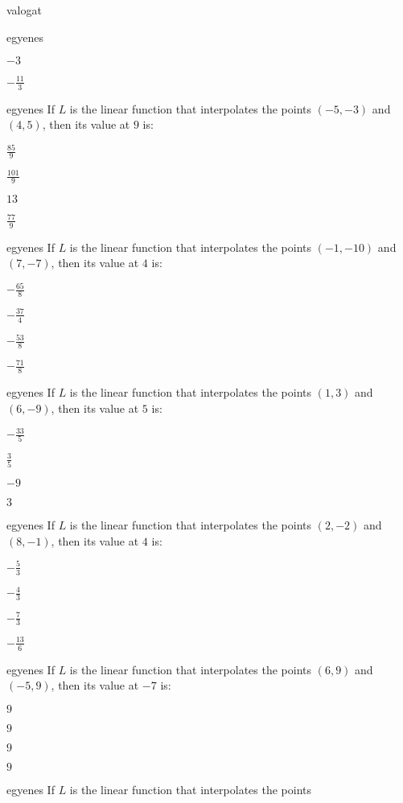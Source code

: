 \documentclass[12pt]{article}
\begin{document}
\begin{quiz}{valogat}
\begin{multi}{egyenes}
\item  $ -3 $
\item  $ -\frac{11}{3} $
\end{multi}
\begin{multi}{egyenes}
If $L$ is the linear function that interpolates the points
$(-5,-3)$ and $(4,5)$, then its value at $9$ is:
\item* $ \frac{85}{9} $
\item  $ \frac{101}{9} $
\item  $ 13 $
\item  $ \frac{77}{9} $
\end{multi}
\begin{multi}{egyenes}
If $L$ is the linear function that interpolates the points
$(-1,-10)$ and $(7,-7)$, then its value at $4$ is:
\item* $ -\frac{65}{8} $
\item  $ -\frac{37}{4} $
\item  $ -\frac{53}{8} $
\item  $ -\frac{71}{8} $
\end{multi}
\begin{multi}{egyenes}
If $L$ is the linear function that interpolates the points
$(1,3)$ and $(6,-9)$, then its value at $5$ is:
\item* $ -\frac{33}{5} $
\item  $ \frac{3}{5} $
\item  $ -9 $
\item  $ 3 $
\end{multi}
\begin{multi}{egyenes}
If $L$ is the linear function that interpolates the points
$(2,-2)$ and $(8,-1)$, then its value at $4$ is:
\item* $ -\frac{5}{3} $
\item  $ -\frac{4}{3} $
\item  $ -\frac{7}{3} $
\item  $ -\frac{13}{6} $
\end{multi}
\begin{multi}{egyenes}
If $L$ is the linear function that interpolates the points
$(6,9)$ and $(-5,9)$, then its value at $-7$ is:
\item* $ 9 $
\item  $ 9 $
\item  $ 9 $
\item  $ 9 $
\end{multi}
\begin{multi}{egyenes}
If $L$ is the linear function that interpolates the points

\end{multi}
\end{quiz}
\end{document}
